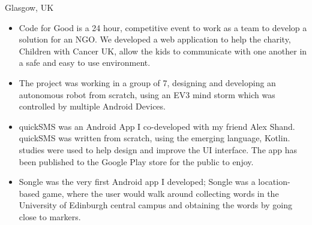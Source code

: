 \documentclass[10pt,a4paper]{altacv}
\begin{document}

  {Glasgow, UK}
\begin{itemize}
\item Code for Good is a 24 hour, competitive event to work as a team to develop a solution for an NGO. We developed a web application to help the charity, Children with Cancer UK, allow the kids to communicate with one another in a safe and easy to use environment.
\end{itemize}
\divider


\begin{itemize}
\item The project was working in a group of 7, designing and developing an autonomous robot from scratch, using an EV3 mind storm which was controlled by multiple Android Devices.

\end{itemize}
\divider

\begin{itemize}
\item quickSMS was an Android App I co-developed with my friend Alex Shand. quickSMS was written from scratch, using the emerging language, Kotlin. 
\itemUser studies were used to help design and improve the UI interface. The app has been published to the Google Play store for the public to enjoy.

\end{itemize}
\divider

\begin{itemize}
\item Songle was the very first Android app I developed; Songle was a location-based game, where the user would walk around collecting words in the University of Edinburgh central campus and obtaining the words by going close to markers.

\end{itemize}
\end{document}
